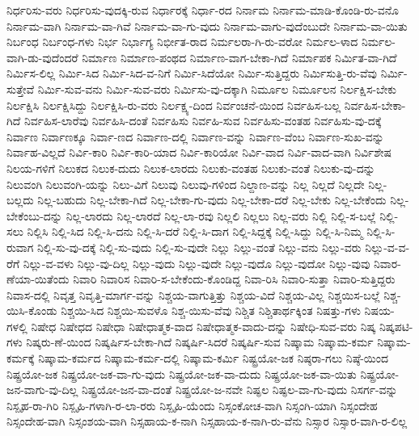 {ನಿರ್ಧರಿಸು-ವರು
ನಿರ್ಧರಿಸು-ವುದಕ್ಕಿ-ರುವ
ನಿರ್ಧಾರಕ್ಕೆ
ನಿರ್ಧಾ-ರದ
ನಿರ್ನಾಮ
ನಿರ್ನಾಮ-ಮಾಡಿ-ಕೊಂಡಿ-ರು-ವನೊ
ನಿರ್ನಾಮ-ವಾಗಿ
ನಿರ್ನಾಮ-ವಾ-ಗಿವೆ
ನಿರ್ನಾಮ-ವಾ-ಗು-ವುದು
ನಿರ್ನಾಮ-ವಾಗು-ವುದೆಂಬುದೇ
ನಿರ್ನಾಮ-ವಾ-ಯಿತು
ನಿರ್ಬಂಧ
ನಿರ್ಬಂಧ-ಗಳು
ನಿರ್ಭ
ನಿರ್ಭಾಗ್ಯ
ನಿರ್ಭೀತ-ರಾದ
ನಿರ್ಮಲರಾ-ಗಿ-ರು-ವರೋ
ನಿರ್ಮಲ-ಳಾದ
ನಿರ್ಮಲ-ವಾಗಿ-ಡು-ವುದೆಂದರೆ
ನಿರ್ಮಾಣ
ನಿರ್ಮಾಣ-ಪಂಥದ
ನಿರ್ಮಾಣ-ವಾಗ-ಬೇಕಾ-ಗಿದೆ
ನಿರ್ಮಾಪಕ
ನಿರ್ಮಿತ-ವಾ-ಗಿದೆ
ನಿರ್ಮಿಸ-ಲಿಲ್ಲ
ನಿರ್ಮಿ-ಸಿದ
ನಿರ್ಮಿ-ಸಿದ-ವ-ನಿಗೆ
ನಿರ್ಮಿ-ಸಿದೆಯೋ
ನಿರ್ಮಿ-ಸುತ್ತಿದ್ದರು
ನಿರ್ಮಿಸುತ್ತಿ-ರು-ವೆವು
ನಿರ್ಮಿ-ಸುತ್ತೇವೆ
ನಿರ್ಮಿ-ಸುವ-ವನು
ನಿರ್ಮಿ-ಸುವ-ವರು
ನಿರ್ಮಿಸು-ವು-ದಕ್ಕಾಗಿ
ನಿರ್ಮೂಲ
ನಿರ್ಮೂಲನ
ನಿರ್ಲಕ್ಷಿಸ-ಬೇಕು
ನಿರ್ಲಕ್ಷಿಸಿ
ನಿರ್ಲಕ್ಷಿಸಿದ್ದು
ನಿರ್ಲಕ್ಷಿಸಿ-ರು-ವರು
ನಿರ್ಲಕ್ಷ್ಯ-ದಿಂದ
ನಿರ್ವಂಚನೆ-ಯಿಂದ
ನಿರ್ವಹಿಸ-ಬಲ್ಲ
ನಿರ್ವಹಿಸ-ಬೇಕಾ-ಗಿದೆ
ನಿರ್ವಹಿಸ-ಲಾರೆವು
ನಿರ್ವಹಿಸಿ-ದಂತೆ
ನಿರ್ವಹಿಸು
ನಿರ್ವಹಿ-ಸುವ
ನಿರ್ವಹಿಸು-ವಂತಹ
ನಿರ್ವಹಿಸು-ವು-ದಕ್ಕೆ
ನಿರ್ವಾಣ
ನಿರ್ವಾಣಕ್ಕೂ
ನಿರ್ವಾ-ಣದ
ನಿರ್ವಾಣ-ದಲ್ಲಿ
ನಿರ್ವಾಣ-ವನ್ನು
ನಿರ್ವಾಣ-ವೆಂಬ
ನಿರ್ವಾಣ-ಸುಖ-ವನ್ನು
ನಿರ್ವಾಹ-ವಿಲ್ಲದೆ
ನಿರ್ವಿ-ಕಾರಿ
ನಿರ್ವಿ-ಕಾರಿ-ಯಾದ
ನಿರ್ವಿ-ಕಾರಿಯೋ
ನಿರ್ವಿ-ವಾದ
ನಿರ್ವಿ-ವಾದ-ವಾಗಿ
ನಿರ್ವಿಶೇಷ
ನಿಲಯ-ಗಳಿಗೆ
ನಿಲುಕದ
ನಿಲುಕ-ದುದು
ನಿಲುಕ-ಲಾರದು
ನಿಲುಕು-ವಂತಹ
ನಿಲುಕು-ವಂತೆ
ನಿಲುಕು-ವು-ದನ್ನು
ನಿಲುವಂಗಿ
ನಿಲುವಂಗಿ-ಯನ್ನು
ನಿಲು-ವಿಗೆ
ನಿಲುವು
ನಿಲುವು-ಗಳಿಂದ
ನಿಲ್ದಾಣ-ವನ್ನು
ನಿಲ್ಲ
ನಿಲ್ಲದೆ
ನಿಲ್ಲದೇ
ನಿಲ್ಲ-ಬಲ್ಲದು
ನಿಲ್ಲ-ಬಹುದು
ನಿಲ್ಲ-ಬೇಕಾ-ಗಿದೆ
ನಿಲ್ಲ-ಬೇಕಾ-ಗು-ವುದು
ನಿಲ್ಲ-ಬೇಕಾ-ದರೆ
ನಿಲ್ಲ-ಬೇಕು
ನಿಲ್ಲ-ಬೇಕೆಂದು
ನಿಲ್ಲ-ಬೇಕೆಂಬು-ದನ್ನು
ನಿಲ್ಲ-ಲಾರದು
ನಿಲ್ಲ-ಲಾರದೆ
ನಿಲ್ಲ-ಲಾ-ರವು
ನಿಲ್ಲಲಿ
ನಿಲ್ಲಲು
ನಿಲ್ಲ-ವರು
ನಿಲ್ಲಿ
ನಿಲ್ಲಿ-ಸ-ಬಲ್ಲೆ
ನಿಲ್ಲಿ-ಸಲು
ನಿಲ್ಲಿಸಿ
ನಿಲ್ಲಿ-ಸಿದ
ನಿಲ್ಲಿ-ಸಿ-ದನು
ನಿಲ್ಲಿ-ಸಿ-ದರೆ
ನಿಲ್ಲಿ-ಸಿ-ದಾಗ
ನಿಲ್ಲಿ-ಸಿದ್ದಕ್ಕೆ
ನಿಲ್ಲಿ-ಸಿದ್ದು
ನಿಲ್ಲಿ-ಸಿ-ನಿಮ್ಮ
ನಿಲ್ಲಿ-ಸಿ-ರುವಾಗ
ನಿಲ್ಲಿ-ಸು-ವು-ದಕ್ಕೆ
ನಿಲ್ಲಿ-ಸು-ವುದು
ನಿಲ್ಲಿ-ಸು-ವುದೇ
ನಿಲ್ಲು
ನಿಲ್ಲು-ವಂತೆ
ನಿಲ್ಲು-ವನು
ನಿಲ್ಲು-ವರು
ನಿಲ್ಲು-ವ-ವ-ರೆಗೆ
ನಿಲ್ಲು-ವ-ವಳು
ನಿಲ್ಲು-ವು-ದಿಲ್ಲ
ನಿಲ್ಲು-ವುದು
ನಿಲ್ಲು-ವುದೇ
ನಿಲ್ಲು-ವುದೊ
ನಿಲ್ಲು-ವುದೋ
ನಿಲ್ಲು-ವುವು
ನಿವಾರ-ಣೆಯಾ-ಯಿತೆಂದು
ನಿವಾರಿ
ನಿವಾರಿಸ
ನಿವಾರಿ-ಸ-ಬೇಕೆಂದು-ಕೊಂಡಿದ್ದ
ನಿವಾ-ರಿಸಿ
ನಿವಾರಿ-ಸುತ್ತಾ
ನಿವಾರಿ-ಸುತ್ತಿದ್ದರು
ನಿವಾಸ-ದಲ್ಲಿ
ನಿವೃತ್ತ
ನಿವೃತ್ತಿ-ಮಾರ್ಗ-ವನ್ನು
ನಿಶ್ಚಯ-ವಾಗುತ್ತಿತ್ತು
ನಿಶ್ಚಯ-ವಿದೆ
ನಿಶ್ಚಯ-ವಿಲ್ಲ
ನಿಶ್ಚಯಿಸ-ಬಲ್ಲೆ
ನಿಶ್ಚ-ಯಿಸಿ-ಕೊಂಡು
ನಿಶ್ಚಯಿ-ಸಿದ
ನಿಶ್ಚಯಿ-ಸುವಳೊ
ನಿಶ್ಚ-ಯಿಸು-ವೆವು
ನಿಶ್ಚಿತ
ನಿಶ್ಚಿತಾರ್ಥಕ್ಕಿಂತ
ನಿಷತ್ತು-ಗಳು
ನಿಷಯ-ಗಳಲ್ಲಿ
ನಿಷೇಧ
ನಿಷೇಧದ
ನಿಷೇಧಾ
ನಿಷೇಧಾತ್ಮಕ-ವಾದ
ನಿಷೇಧಾತ್ಮಕ-ವಾದು-ದನ್ನು
ನಿಷೇಧಿ-ಸುವ-ವರು
ನಿಷ್ಕ
ನಿಷ್ಕಪಟಿ-ಗಳು
ನಿಷ್ಕರು-ಣೆ-ಯಿಂದ
ನಿಷ್ಕರ್ಷಿಸ-ಬೇಕಾ-ಗಿದೆ
ನಿಷ್ಕರ್ಷಿ-ಸಿದರೆ
ನಿಷ್ಕರ್ಷಿ-ಸುವ
ನಿಷ್ಕಾಮ
ನಿಷ್ಕಾಮ-ಕರ್ಮ
ನಿಷ್ಕಾಮ-ಕರ್ಮಕ್ಕೆ
ನಿಷ್ಕಾಮ-ಕರ್ಮದ
ನಿಷ್ಕಾಮ-ಕರ್ಮ-ದಲ್ಲಿ
ನಿಷ್ಕಾಮ-ಕರ್ಮಿ
ನಿಷ್ಟ್ರಯೋ-ಜಕ
ನಿಷ್ಠರಾ-ಗಲು
ನಿಷ್ಠೆ-ಯಿಂದ
ನಿಷ್ಪ್ರಯೋ-ಜಕ
ನಿಷ್ಪ್ರಯೋ-ಜಕ-ವಾ-ಗು-ವುದು
ನಿಷ್ಪ್ರಯೋ-ಜಕ-ವಾ-ದುದು
ನಿಷ್ಪ್ರಯೋ-ಜಕ-ವಾ-ಯಿತು
ನಿಷ್ಪ್ರಯೋ-ಜನ-ವಾಗು-ವು-ದಿಲ್ಲ
ನಿಷ್ಪ್ರಯೋ-ಜನ-ವಾ-ದಂತೆ
ನಿಷ್ಪ್ರಯೋ-ಜ-ನವೇ
ನಿಷ್ಫಲ
ನಿಷ್ಫಲ-ವಾ-ಗು-ವುದು
ನಿಸರ್ಗ-ವನ್ನು
ನಿಸ್ಪೃಹ-ರಾ-ಗಿರಿ
ನಿಸ್ಪೃಹಿ-ಗಳಾಗಿ-ರ-ಲಾ-ರರು
ನಿಸ್ಪೃಹಿ-ಯೆಂದು
ನಿಸ್ಸಂಕೋಚ-ವಾಗಿ
ನಿಸ್ಸಂಗಿ-ಯಾಗಿ
ನಿಸ್ಸಂದೇಹ
ನಿಸ್ಸಂದೇಹ-ವಾಗಿ
ನಿಸ್ಸಂಶಯ-ವಾಗಿ
ನಿಸ್ಸಹಾಯ-ಕ-ನಾಗಿ
ನಿಸ್ಸಹಾಯ-ಕ-ನಾಗಿ-ರು-ವೆನು
ನಿಸ್ಸಾರ
ನಿಸ್ಸಾರ-ವಾಗಿ-ರ-ಲಿಲ್ಲ
}

